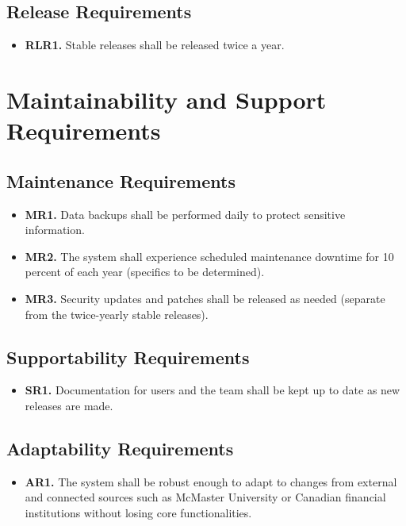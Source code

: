 \documentclass[12pt]{article}
\begin{document}
\subsection{Release Requirements}
\begin{itemize}
    \item \textbf{RLR1.} Stable releases shall be released twice a year.
\end{itemize}

\section{Maintainability and Support Requirements}
\subsection{Maintenance Requirements}
\begin{itemize}
    \item \textbf{MR1.} Data backups shall be performed daily to protect sensitive information.
    \item \textbf{MR2.} The system shall experience scheduled maintenance downtime for 10 percent of each year (specifics to be determined).
    \item \textbf{MR3.} Security updates and patches shall be released as needed (separate from the twice-yearly stable releases).
\end{itemize}

\subsection{Supportability Requirements}
\begin{itemize}
    \item \textbf{SR1.} Documentation for users and the team shall be kept up to date as new releases are made.
\end{itemize}

\subsection{Adaptability Requirements}
\begin{itemize}
    \item \textbf{AR1.} The system shall be robust enough to adapt to changes from external and connected sources such as McMaster University or Canadian financial institutions without losing core functionalities.
\end{itemize}
\end{document}
